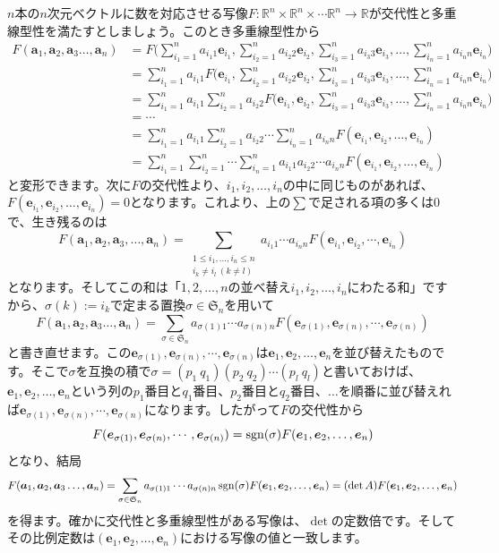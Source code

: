 $n$本の$n$次元ベクトルに数を対応させる写像$F\colon \mathbb{R}^n \times \mathbb{R}^n \times \cdots \mathbb{R}^n \rightarrow \mathbb{R}$が交代性と多重線型性を満たすとしましょう。このとき多重線型性から
\begin{align*}
F(\bm{a}_1, \bm{a}_2, \bm{a}_3 \ldots, \bm{a}_n)
&= F\Biggl( \sum_{i_1 = 1}^n a_{i_1 1}\bm{e}_{i_1} , \sum_{i_2 = 1}^n a_{i_2 2}\bm{e}_{i_2}, \sum_{i_3 = 1}^n a_{i_3 3}\bm{e}_{i_3}, \ldots, \sum_{i_n = 1}^n a_{i_n n}\bm{e}_{i_n}\Biggr) \\
&= \sum_{i_1 = 1}^n a_{i_1 1} F\biggl(\bm{e}_{i_1}, \sum_{i_2 = 1}^n a_{i_2 2}\bm{e}_{i_2}, \sum_{i_3 = 1}^n a_{i_3 3}\bm{e}_{i_3}, \ldots, \sum_{i_n = 1}^n a_{i_n n}\bm{e}_{i_n}\biggr) \\
&= \sum_{i_1 = 1}^n a_{i_1 1} \sum_{i_2 = 1}^n a_{i_2 2} F\biggl(\bm{e}_{i_1}, \bm{e}_{i_2}, \sum_{i_3 = 1}^n a_{i_3 3}\bm{e}_{i_3}, \ldots, \sum_{i_n = 1}^n a_{i_n n}\bm{e}_{i_n}\biggr) \\
&= \cdots \\
&= \sum_{i_1 = 1}^n a_{i_1 1} \sum_{i_2 = 1}^n a_{i_2 2} \cdots \sum_{i_n = 1}^n a_{i_n n}  F(\bm{e}_{i_1}, \bm{e}_{i_2}, \ldots, \bm{e}_{i_n}) \\
&= \sum_{i_1 = 1}^n \sum_{i_2 = 1}^n \cdots \sum_{i_n = 1}^n a_{i_1 1} a_{i_2 2} \cdots a_{i_n n}  F(\bm{e}_{i_1}, \bm{e}_{i_2}, \ldots, \bm{e}_{i_n})
\end{align*}
と変形できます。次に$F$の交代性より、$i_1, i_2, \ldots, i_n$の中に同じものがあれば、$F(\bm{e}_{i_1}, \bm{e}_{i_2}, \ldots, \bm{e}_{i_n}) = 0$となります。これより、上の$\sum$で足される項の多くは$0$で、生き残るのは
\[
F(\bm{a}_1, \bm{a}_2, \bm{a}_3, \ldots, \bm{a}_n) = \sum_{\substack{1 \leq i_1, \ldots, i_n \leq n \\ i_k \neq i_l \ (k \neq l)}} a_{i_1 1} \cdots a_{i_n n} F(\bm{e}_{i_1}, \bm{e}_{i_2}, \cdots, \bm{e}_{i_n})
\]
となります。そしてこの和は「$1, 2, \ldots, n$の並べ替え$i_1, i_2, \ldots, i_n$にわたる和」ですから、$\sigma(k) := i_k$で定まる置換$\sigma \in \mathfrak{S}_n$を用いて
\[
F(\bm{a}_1, \bm{a}_2, \bm{a}_3 \ldots, \bm{a}_n) = \sum_{\sigma \in \mathfrak{S}_n} a_{\sigma(1) 1} \cdots a_{\sigma(n) n} F(\bm{e}_{\sigma(1)}, \bm{e}_{\sigma(n)}, \cdots, \bm{e}_{\sigma(n)})
\]
と書き直せます。この$\bm{e}_{\sigma(1)}, \bm{e}_{\sigma(n)}, \cdots, \bm{e}_{\sigma(n)}$は$\bm{e}_1, \bm{e}_2, \ldots, \bm{e}_n$を並び替えたものです。そこで$\sigma$を互換の積で$\sigma = (p_1 \ q_1)(p_2 \ q_2) \cdots (p_l \ q_l)$と書いておけば、$\bm{e}_1, \bm{e}_2, \ldots, \bm{e}_n$という列の$p_1$番目と$q_1$番目、$p_2$番目と$q_2$番目、$\ldots$を順番に並び替えれば$\bm{e}_{\sigma(1)}, \bm{e}_{\sigma(n)}, \cdots, \bm{e}_{\sigma(n)}$になります。したがって$F$の交代性から
\[
F(\boldsymbol{e}_{\sigma(1)}, \boldsymbol{e}_{\sigma(n)}, \cdots, \boldsymbol{e}_{\sigma(n)}) = \operatorname{sgn}(\sigma) F(\boldsymbol{e}_1, \boldsymbol{e}_2, \ldots, \boldsymbol{e}_n)
\]
となり、結局
\[
F(\boldsymbol{a}_1, \boldsymbol{a}_2, \boldsymbol{a}_3 \ldots, \boldsymbol{a}_n) = \sum_{\sigma \in \mathfrak{S}_n} a_{\sigma(1) 1} \cdots a_{\sigma(n) n} \operatorname{sgn}(\sigma) F(\boldsymbol{e}_1, \boldsymbol{e}_2, \ldots, \boldsymbol{e}_n) = (\det A) F(\boldsymbol{e}_1, \boldsymbol{e}_2, \ldots, \boldsymbol{e}_n)
\]
を得ます。確かに交代性と多重線型性がある写像は、$\det$の定数倍です。そしてその比例定数は$(\bm{e}_1, \bm{e}_2, \ldots, \bm{e}_n)$における写像の値と一致します。

